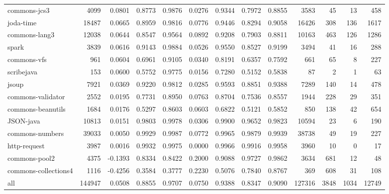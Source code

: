 \begin{table}
\begin{tabular}{lrrrrrrrrrrrr}
           commons-jcs3 &    4099 &      0.0801 &  0.8773 &     0.9876 &     0.0276 &  0.9344 &     0.7972 &   0.8855 &    3583 &    45 &    13 &    458 \\
              joda-time &   18487 &      0.0665 &  0.8959 &     0.9816 &     0.0776 &  0.9446 &     0.8294 &   0.9058 &   16426 &   308 &   136 &   1617 \\
          commons-lang3 &   12038 &      0.0644 &  0.8547 &     0.9564 &     0.0892 &  0.9208 &     0.7903 &   0.8811 &   10163 &   463 &   126 &   1286 \\
                  spark &    3839 &      0.0616 &  0.9143 &     0.9884 &     0.0526 &  0.9550 &     0.8527 &   0.9199 &    3494 &    41 &    16 &    288 \\
            commons-vfs &     961 &      0.0604 &  0.6961 &     0.9105 &     0.0340 &  0.8191 &     0.6357 &   0.7592 &     661 &    65 &     8 &    227 \\
             scribejava &     153 &      0.0600 &  0.5752 &     0.9775 &     0.0156 &  0.7280 &     0.5152 &   0.5838 &      87 &     2 &     1 &     63 \\
                  jsoup &    7921 &      0.0369 &  0.9220 &     0.9812 &     0.0285 &  0.9593 &     0.8851 &   0.9388 &    7289 &   140 &    14 &    478 \\
      commons-validator &    2552 &      0.0195 &  0.7731 &     0.8950 &     0.0763 &  0.8704 &     0.7536 &   0.8557 &    1944 &   228 &    29 &    351 \\
      commons-beanutils &    1684 &      0.0176 &  0.5297 &     0.8603 &     0.0603 &  0.6822 &     0.5121 &   0.5852 &     850 &   138 &    42 &    654 \\
              JSON-java &   10813 &      0.0151 &  0.9803 &     0.9978 &     0.0306 &  0.9900 &     0.9652 &   0.9823 &   10594 &    23 &     6 &    190 \\
        commons-numbers &   39033 &      0.0050 &  0.9929 &     0.9987 &     0.0772 &  0.9965 &     0.9879 &   0.9939 &   38738 &    49 &    19 &    227 \\
           http-request &    3987 &      0.0016 &  0.9932 &     0.9975 &     0.0000 &  0.9966 &     0.9916 &   0.9958 &    3960 &    10 &     0 &     17 \\
          commons-pool2 &    4375 &     -0.1393 &  0.8334 &     0.8422 &     0.2000 &  0.9088 &     0.9727 &   0.9862 &    3634 &   681 &    12 &     48 \\
   commons-collections4 &    1116 &     -0.4256 &  0.3584 &     0.3777 &     0.2230 &  0.5076 &     0.7840 &   0.8767 &     369 &   608 &    31 &    108 \\
                    all &  144947 &      0.0508 &  0.8855 &     0.9707 &     0.0750 &  0.9388 &     0.8347 &   0.9090 &  127316 &  3848 &  1034 &  12749 \\
\bottomrule
\end{tabular}
\end{table}

